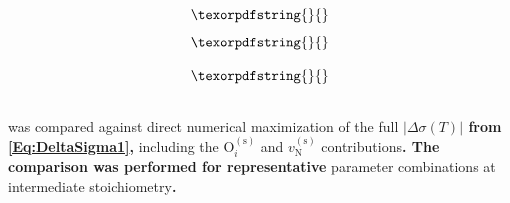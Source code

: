 \documentclass[preprint,12pt,sort&compress]{elsarticle}
\newcommand{\?}{\stackrel{?}{=}}
\providecommand{\DIFaddtex}[1]{{\bf #1}} %
\providecommand{\DIFdeltex}[1]{} %
\providecommand{\DIFaddbegin}{\protect\color{blue}} %
\providecommand{\DIFaddend}{\protect\color{black}} %
\providecommand{\DIFdelbegin}{\protect\color{red}} %
\providecommand{\DIFdelend}{\protect\color{black}} %
\providecommand{\DIFadd}[1]{\texorpdfstring{\DIFaddtex{#1}}{#1}} %
\providecommand{\DIFdel}[1]{\texorpdfstring{\DIFdeltex{#1}}{}} %
\begin{document}
\DIFdelbegin \subsection{\DIFdel{Dependence of }%
\DIFdel{on the nucleation time }%
}
\addtocounter{subsection}{-1}%

\DIFdel{\cref{Eq:App:TstarExplicit} makes explicit that $t$ enters the expression for $T_\text{peak}$ only through a logarithm. Differentiating with respect to $\ln t$:
}\begin{displaymath}
\DIFdel{\frac{dT_\text{peak}}{d\ln t}
=
-\frac{E_m + E_f(v_\text{N}^{(\text{b})})}{
k\left[\ln\!\left(A_0 t / \lambda_v^2\right)\right]^2
}
=
-\frac{k\,T_\text{peak}^2}{E_m + E_f(v_\text{N}^{(\text{b})})},
\label{Eq:App:dTpeak_dlogt}
}\end{displaymath}%
\DIFdel{where $A_0 \equiv f z \lambda^2 \nu / (6 c_\text{O})$. Thus increasing $t$ lowers $T_\text{peak}$, but only weakly. For an order-of-magnitude change in $t$:
}\begin{displaymath}
\DIFdel{\Delta T_\text{peak}
\approx
-\frac{k\,T_\text{peak}^2}{E_m + E_f(v_\text{N}^{(\text{b})})}\,\ln 10.
}\end{displaymath}%

\DIFdel{Taking $E_m + E_f(v_\text{N}^{(\text{b})}) = 5.19$~eV (intermediate stoichiometry) and $T_\text{peak} = 1448$~K (the expected value for $R_v$ = 1 nm, $w_\text{O}$ = 1500 ppm, $p$ = 0.05) gives:
}\begin{displaymath}
\DIFdel{\Delta T_\text{peak} \approx -80~\text{K}.
}\end{displaymath}%
\DIFdel{This confirms that $T_\text{peak}$ is only logarithmically sensitive to the nucleation time.
}%

\subsection{\DIFdel{Numerical validation and parametric trends}}
\addtocounter{subsection}{-1}%

\DIFdel{\Cref{Eq:App:TstarFormula} }\DIFdelend \DIFaddbegin \DIFadd{ }\DIFaddend was compared against direct numerical maximization of the full \DIFdelbegin \DIFdel{$|\Delta \sigma|(T)$ from \cref{Eq:DeltaSigma1}(}\DIFdelend \DIFaddbegin \DIFadd{$ |\Delta\sigma(T)| $ from \cref{Eq:DeltaSigma1}, }\DIFaddend including the $\text{O}_i^{(\text{s})}$ and $v_\text{N}^{(\text{s})}$ contributions\DIFdelbegin \DIFdel{) for a grid of }\DIFdelend \DIFaddbegin \DIFadd{. The comparison was performed for representative }\DIFaddend parameter combinations at intermediate stoichiometry\DIFdelbegin \DIFdel{:
}\DIFdelend \DIFaddbegin \DIFadd{.
}\DIFaddend 
\end{document}
